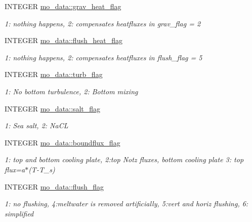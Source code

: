 \begin{DoxyCompactItemize}
INTEGER \hyperlink{namespacemo__data_aab5e39e0b6060d7ef40979d070b89dca}{mo\_\-data::grav\_\-heat\_\-flag}
\begin{DoxyCompactList}\small\item\em 1: nothing happens, 2: compensates heatfluxes in grav\_\-flag = 2 \item\end{DoxyCompactList}\item 
INTEGER \hyperlink{namespacemo__data_a2f88c08cc3cae9d46a6bdcd9232ddbfa}{mo\_\-data::flush\_\-heat\_\-flag}
\begin{DoxyCompactList}\small\item\em 1: nothing happens, 2: compensates heatfluxes in flush\_\-flag = 5 \item\end{DoxyCompactList}\item 
INTEGER \hyperlink{namespacemo__data_a7cc5384bbfd0b56d61cfe78576ee886d}{mo\_\-data::turb\_\-flag}
\begin{DoxyCompactList}\small\item\em 1: No bottom turbulence, 2: Bottom mixing \item\end{DoxyCompactList}\item 
INTEGER \hyperlink{namespacemo__data_a0fb41b8dc5463c7215d278a301f17509}{mo\_\-data::salt\_\-flag}
\begin{DoxyCompactList}\small\item\em 1: Sea salt, 2: NaCL \item\end{DoxyCompactList}\item 
INTEGER \hyperlink{namespacemo__data_a6089c1127efc972f4488515f75ca8e80}{mo\_\-data::boundflux\_\-flag}
\begin{DoxyCompactList}\small\item\em 1: top and bottom cooling plate, 2:top Notz fluxes, bottom cooling plate 3: top flux=a$\ast$(T-\/T\_\-s) \item\end{DoxyCompactList}\item 
INTEGER \hyperlink{namespacemo__data_aa062c97301f949aea320e57c72926700}{mo\_\-data::flush\_\-flag}
\begin{DoxyCompactList}\small\item\em 1: no flushing, 4:meltwater is removed artificially, 5:vert and horiz flushing, 6: simplified \item\end{DoxyCompactList}\item 

\end{DoxyCompactItemize}

